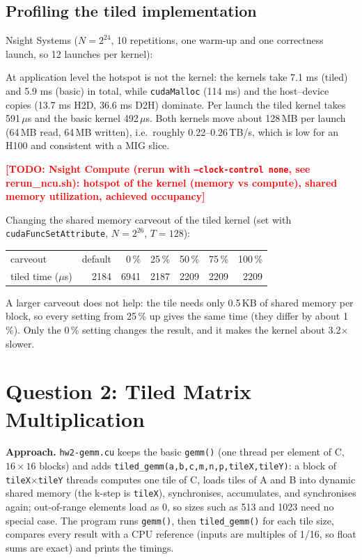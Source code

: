 \documentclass[11pt,a4paper]{article}
\newcommand{\todo}[1]{\textcolor{red}{\textbf{[TODO: #1]}}}
\begin{document}
\subsection{Profiling the tiled implementation}
Nsight Systems ($N=2^{24}$, 10 repetitions, one warm-up and one correctness launch, so 12 launches per kernel):

At application level the hotspot is not the kernel: the kernels take 7.1 ms (tiled) and 5.9 ms (basic) in total,
while \texttt{cudaMalloc} (114 ms) and the host--device copies (13.7 ms H2D, 36.6 ms D2H) dominate. Per launch the
tiled kernel takes 591\,$\mu$s and the basic kernel 492\,$\mu$s. Both kernels move about 128\,MB per launch
(64\,MB read, 64\,MB written), i.e.\ roughly 0.22--0.26\,TB/s, which is low for an H100 and consistent with a MIG
slice.

\todo{Nsight Compute (rerun with \texttt{--clock-control none}, see rerun\_ncu.sh): hotspot of the kernel (memory vs compute), shared memory utilization, achieved occupancy}

Changing the shared memory carveout of the tiled kernel (set with \texttt{cudaFuncSetAttribute},
$N=2^{26}$, $T=128$):
\begin{center}
\small
\begin{tabular}{lrrrrrr}
\toprule
carveout & default & 0\,\% & 25\,\% & 50\,\% & 75\,\% & 100\,\% \\
tiled time ($\mu$s) & 2184 & 6941 & 2187 & 2209 & 2209 & 2209 \\
\bottomrule
\end{tabular}
\end{center}
A larger carveout does not help: the tile needs only 0.5\,KB of shared memory per block, so every setting from
25\,\% up gives the same time (they differ by about 1\,\%). Only the 0\,\% setting changes
the result, and it makes the kernel about 3.2$\times$ slower.

\section{Question 2: Tiled Matrix Multiplication}

\textbf{Approach.} \texttt{hw2-gemm.cu} keeps the basic \texttt{gemm()} (one thread per element of C, $16\times16$ blocks)
and adds \texttt{tiled\_gemm(a,b,c,m,n,p,tileX,tileY)}: a block of \texttt{tileX}$\times$\texttt{tileY} threads
computes one tile of C, loads tiles of A and B into dynamic shared memory (the k-step is \texttt{tileX}),
synchronises, accumulates, and synchronises again; out-of-range elements load as 0, so sizes such as 513 and 1023
need no special case. The program runs \texttt{gemm()}, then \texttt{tiled\_gemm()} for each tile size, compares
every result with a CPU reference (inputs are multiples of 1/16, so float sums are exact) and prints the timings.
\end{document}
